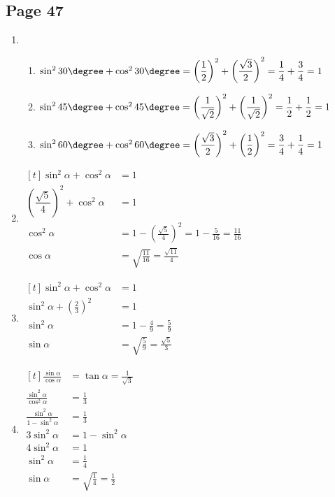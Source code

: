 \documentclass{article}
\newenvironment{solutions}[1]
{\subsection*{#1}
 \begin{enumerate}[leftmargin=1.5em]}
{\end{enumerate}}
\newcommand{\solution}{\item}
\newenvironment{subsolutions}
{\begin{enumerate}}
{\end{enumerate}}
\newcommand{\subsolution}{\item}
\begin{document}
\begin{solutions}{Page 47}
\solution %
\begin{subsolutions}
\subsolution $\sin^{2}{30\degree} + \cos^{2}{30\degree} = \left(\dfrac{1}{2}\right)^2 + \left(\dfrac{\sqrt{3}}{2}\right)^2 = \dfrac{1}{4} + \dfrac{3}{4} = 1$
\subsolution $\sin^{2}{45\degree} + \cos^{2}{45\degree} = \left(\dfrac{1}{\sqrt{2}}\right)^2 + \left(\dfrac{1}{\sqrt{2}}\right)^2 = \dfrac{1}{2} + \dfrac{1}{2} = 1$
\subsolution $\sin^{2}{60\degree} + \cos^{2}{60\degree} = \left(\dfrac{\sqrt{3}}{2}\right)^2 + \left(\dfrac{1}{2}\right)^2= \dfrac{3}{4} + \dfrac{1}{4} = 1$
\end{subsolutions}

\solution %
$\begin{aligned}[t]
\sin^{2}{\alpha} + \cos^{2}{\alpha} &= 1 \\
\left(\dfrac{\sqrt{5}}{4}\right)^2 + \cos^{2}{\alpha} &= 1 \\
\cos^{2}{\alpha} &= 1 - \left(\frac{\sqrt{5}}{4}\right)^2 = 1 - \frac{5}{16} = \frac{11}{16} \\
\cos{\alpha} &= \sqrt{\frac{11}{16}} = \frac{\sqrt{11}}{4}
\end{aligned}$

\solution %
$\begin{aligned}[t]
\sin^{2}{\alpha} + \cos^{2}{\alpha} &= 1 \\
\sin^{2}{\alpha} + \left(\frac{2}{3}\right)^2 &= 1 \\
\sin^{2}{\alpha} &= 1 - \frac{4}{9} = \frac{5}{9} \\
\sin{\alpha} &= \sqrt{\frac{5}{9}} = \frac{\sqrt{5}}{3}
\end{aligned}$

\solution %
$\begin{aligned}[t]
\frac{\sin{\alpha}}{\cos{\alpha}} &= \tan{\alpha} = \frac{1}{\sqrt{3}} \\
\frac{\sin^{2}{\alpha}}{\cos^{2}{\alpha}} &= \frac{1}{3} \\[1ex]
\frac{\sin^{2}{\alpha}}{1 - \sin^{2}{\alpha}} &= \frac{1}{3} \\[1ex]
3\sin^{2}{\alpha} &= 1 - \sin^{2}{\alpha} \\
4\sin^{2}{\alpha} &= 1 \\
\sin^{2}{\alpha} &= \frac{1}{4} \\
\sin{\alpha} &= \sqrt{\frac{1}{4}} = \frac{1}{2}
\end{aligned}$


\end{solutions}
\end{document}
